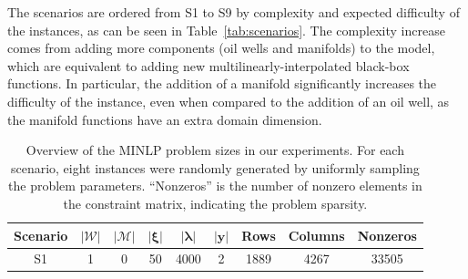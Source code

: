 \documentclass[pdflatex,sn-mathphys-num]{sn-jnl}%
\newcommand{\new}[1]{#1}
\begin{document}
\new{%
The scenarios are ordered from S1 to S9 by complexity and expected difficulty of the instances, as can be seen in Table~\ref{tab:scenarios}.
The complexity increase comes from adding more components (oil wells and manifolds) to the model, which are equivalent to adding new multilinearly-interpolated black-box functions.
In particular, the addition of a manifold significantly increases the difficulty of the instance, even when compared to the addition of an oil well, as the manifold functions have an extra domain dimension.
}

\begin{table}[ht]
\centering
\caption{\new{Overview of the MINLP problem sizes in our experiments. For each scenario, eight instances were randomly generated by uniformly sampling the problem parameters. ``Nonzeros'' is the number of nonzero elements in the constraint matrix, indicating the problem sparsity.}} \label{tab:scenarios}
\label{tab:instances-overview}
\small
\new{%
\begin{tabular}{c  cc  cc  cc  c  c}
\toprule
Scenario 
  & \(|\mathcal{W}|\) 
  & \(|\mathcal{M}|\) 
  & \(|\bm{\xi}|\) 
  & \(|\bm{\lambda}|\) 
  & \(|\bm{y}|\) 
  & Rows 
  & Columns 
  & Nonzeros \\
\midrule
S1 & 1 & 0  &  50  &  4000 & 2  &  1889 &  4267 & 33505 \\

\end{tabular}}
\end{table}
\end{document}
